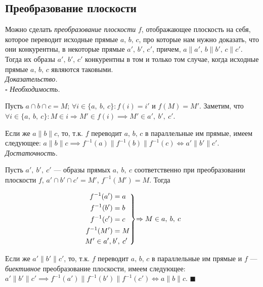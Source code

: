 \documentclass[14pt]{extarticle}
\theoremstyle{definition}
\theoremstyle{theorem}
\renewenvironment{proof}
    {\noindent \textit{Доказательство.}\\
	\indent $\square$}
	{ $\blacksquare$\\ }
\renewenvironment{rcases}
  {\left.\begin{aligned}}
  {\end{aligned}\right\rbrace}
\begin{document}
\subsection{Преобразование плоскости}
Можно сделать \textit{преобразование плоскости} $f$, отображающее плоскость на себя,
которое переводит исходные прямые \(a, \, b, \, c\), про которые нам нужно доказать,
что они конкурентны, в некоторые прямые \(a', \, b', \, c'\), причем,
\(a \parallel a', \, b \parallel b', \, c \parallel c'\).
Тогда их образы \(a', \, b', \, c'\) конкурентны в том и только том случае,
когда исходные прямые \(a, \, b, \, c\) являются таковыми. \\
\begin{proof}
\textit{Необходимость.}

Пусть $a \cap b \cap c = M$; $\forall i \in \{a, \: b, \: c\} \mathpunct{:} f(i) = i'$ 
и $f(M) = M'$. Заметим, что $\forall i \in \{a, \: b, \: c\} \mathpunct{:} M \in i 
\Rightarrow M' \in f(i) \implies M' \in a', \:  b', \: c'$. 

Если же $a \parallel b \parallel c$, то, т.к. $f$ переводит \(a, \, b, \, c\)
в параллельные им прямые, имеем следующее: \(a \parallel b \parallel c \implies
f^{-1}(a) \parallel f^{-1}(b) \parallel f^{-1}(c) \iff a' \parallel b' \parallel
c'\).\\


\textit{Достаточность.}

Пусть $a', \: b', \: c'$ --- образы прямых $a, \: b, \: c$ соответственно при
преобразовании плоскости $f$, $a' \cap b' \cap c' = M'$,
$f^{-1}(M') = M$. Тогда \\
\begin{ceqn}
\[
\begin{rcases}
	f^{-1}(a') &= a\\
	f^{-1}(b') &= b\\
	f^{-1}(c') &= c\\
	f^{-1}(M') &= M\\
	M' \in a', \: &b' , \: c' \\
\end{rcases}
\text{$\Rightarrow M \in a,\: b, \: c$}
\]
\end{ceqn}



Если же $a' \parallel b' \parallel c'$, то, т.к. $f$ переводит \(a, \, b, \, c\)
в параллельные им прямые и \(f\) --- \textit{биективное} преобразование плоскости, имеем
следующее: \(a' \parallel b' \parallel c' \implies
f^{-1}(a') \parallel f^{-1}(b') \parallel f^{-1}(c') \iff a \parallel b \parallel
c\).
\end{proof}
\end{document}
